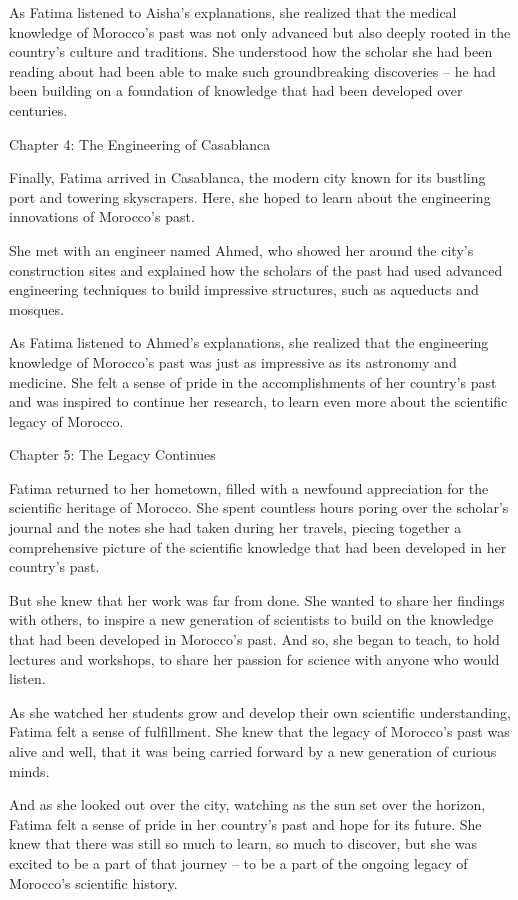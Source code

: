 \documentclass[11,5pt]{report}
\begin{document}
\begin{spacing}{2}
As Fatima listened to Aisha's explanations, she realized that the medical knowledge of Morocco's past was not only advanced but also deeply rooted in the country's culture and traditions. She understood how the scholar she had been reading about had been able to make such groundbreaking discoveries – he had been building on a foundation of knowledge that had been developed over centuries.

Chapter 4: The Engineering of Casablanca

Finally, Fatima arrived in Casablanca, the modern city known for its bustling port and towering skyscrapers. Here, she hoped to learn about the engineering innovations of Morocco's past.

She met with an engineer named Ahmed, who showed her around the city's construction sites and explained how the scholars of the past had used advanced engineering techniques to build impressive structures, such as aqueducts and mosques.

As Fatima listened to Ahmed's explanations, she realized that the engineering knowledge of Morocco's past was just as impressive as its astronomy and medicine. She felt a sense of pride in the accomplishments of her country's past and was inspired to continue her research, to learn even more about the scientific legacy of Morocco.

Chapter 5: The Legacy Continues

Fatima returned to her hometown, filled with a newfound appreciation for the scientific heritage of Morocco. She spent countless hours poring over the scholar's journal and the notes she had taken during her travels, piecing together a comprehensive picture of the scientific knowledge that had been developed in her country's past.

But she knew that her work was far from done. She wanted to share her findings with others, to inspire a new generation of scientists to build on the knowledge that had been developed in Morocco's past. And so, she began to teach, to hold lectures and workshops, to share her passion for science with anyone who would listen.

As she watched her students grow and develop their own scientific understanding, Fatima felt a sense of fulfillment. She knew that the legacy of Morocco's past was alive and well, that it was being carried forward by a new generation of curious minds.

And as she looked out over the city, watching as the sun set over the horizon, Fatima felt a sense of pride in her country's past and hope for its future. She knew that there was still so much to learn, so much to discover, but she was excited to be a part of that journey – to be a part of the ongoing legacy of Morocco's scientific history.
\newline


\end{spacing}
\end{document}
